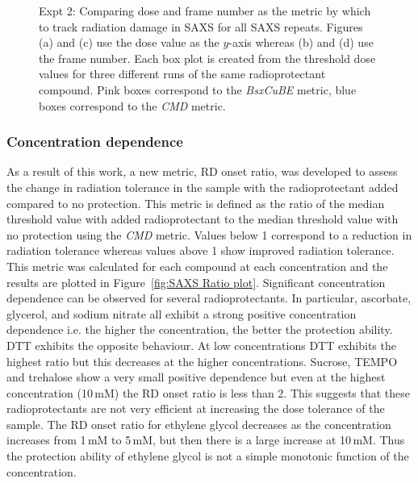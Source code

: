 \begin{figure}
\begin{subfigure}[b]{0.7\textwidth}
            \caption{}
            \label{fig:SAXS frame- 10mM}
    \end{subfigure}
    \caption[Comparing dose and frame number as the metric by which to track radiation damage in SAXS.]{Expt 2: Comparing dose and frame number as the metric by which to track radiation damage in SAXS for all SAXS repeats.
    Figures (a) and (c) use the dose value as the $y$-axis whereas (b) and (d) use the frame number.
    Each box plot is created from the threshold dose values for three different runs of the same radioprotectant compound.
    Pink boxes correspond to the \textit{BsxCuBE} metric, blue boxes correspond to the \textit{CMD} metric.}
    \label{fig:SAXS dose vs frame}
\end{figure}

\subsubsection{Concentration dependence}
\label{subs:Concentration dependence}
As a result of this work, a new metric, RD onset ratio, was developed to assess the change in radiation tolerance in the sample with the radioprotectant added compared to no protection.
This metric is defined as the ratio of the median threshold value with added radioprotectant to the median threshold value with no protection using the \textit{CMD} metric.
Values below 1 correspond to a reduction in radiation tolerance whereas values above 1 show improved radiation tolerance.
This metric was calculated for each compound at each concentration and the results are plotted in Figure~\ref{fig:SAXS Ratio plot}.
Significant concentration dependence can be observed for several radioprotectants.
In particular, ascorbate, glycerol, and sodium nitrate all exhibit a strong positive concentration dependence i.e. the higher the concentration, the better the protection ability.
DTT exhibits the opposite behaviour.
At low concentrations DTT exhibits the highest ratio but this decreases at the higher concentrations.
Sucrose, TEMPO and trehalose show a very small positive dependence but even at the highest concentration (10\,mM) the RD onset ratio is less than 2.
This suggests that these radioprotectants are not very efficient at increasing the dose tolerance of the sample.
The RD onset ratio for ethylene glycol decreases as the concentration increases from 1\,mM to 5\,mM, but then there is a large increase at 10$\,$mM.
Thus the protection ability of ethylene glycol is not a simple monotonic function of the concentration.
